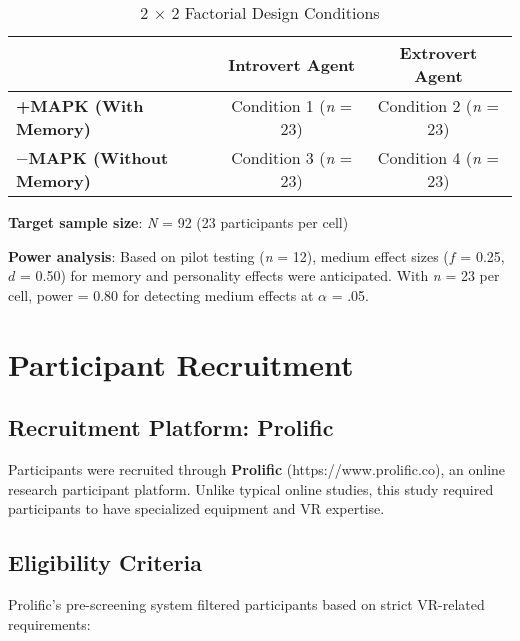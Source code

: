 \documentclass[12pt]{article}
\begin{document}
\begin{table}[h]
\centering
\caption{2 $\times$ 2 Factorial Design Conditions}
\begin{tabular}{lcc}
\toprule
& \textbf{Introvert Agent} & \textbf{Extrovert Agent} \\
\midrule
\textbf{+MAPK (With Memory)} & Condition 1 (\textit{n} = 23) & Condition 2 (\textit{n} = 23) \\
\textbf{$-$MAPK (Without Memory)} & Condition 3 (\textit{n} = 23) & Condition 4 (\textit{n} = 23) \\
\bottomrule
\end{tabular}
\end{table}

\textbf{Target sample size}: \textit{N} = 92 (23 participants per cell)

\textbf{Power analysis}: Based on pilot testing (\textit{n} = 12), medium effect sizes ($f$ = 0.25, $d$ = 0.50) for memory and personality effects were anticipated. With \textit{n} = 23 per cell, power = 0.80 for detecting medium effects at $\alpha$ = .05.

\section{Participant Recruitment}

\subsection{Recruitment Platform: Prolific}

Participants were recruited through \textbf{Prolific} (https://www.prolific.co), an online research participant platform. Unlike typical online studies, this study required participants to have specialized equipment and VR expertise.

\subsection{Eligibility Criteria}

Prolific's pre-screening system filtered participants based on strict VR-related requirements:
\end{document}
